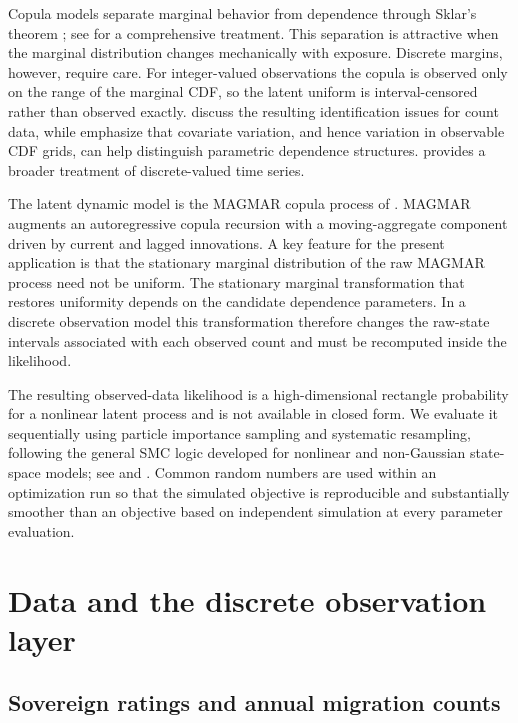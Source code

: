 \documentclass[11pt]{article}
\theoremstyle{definition}
\begin{document}
Copula models separate marginal behavior from dependence through Sklar's theorem
\citep{sklar1959}; see \citet{joe2014} for a comprehensive treatment. This
separation is attractive when the marginal distribution changes mechanically with
exposure. Discrete margins, however, require care. For integer-valued observations
the copula is observed only on the range of the marginal CDF, so the latent uniform
is interval-censored rather than observed exactly. \citet{genestneslehova2007}
discuss the resulting identification issues for count data, while
\citet{trivedizimmer2017} emphasize that covariate variation, and hence variation in
observable CDF grids, can help distinguish parametric dependence structures.
\citet{weiss2018intcount} provides a broader treatment of discrete-valued time
series.

The latent dynamic model is the MAGMAR copula process of
\citet{pappert2026mag}. MAGMAR augments an autoregressive copula recursion with a
moving-aggregate component driven by current and lagged innovations. A key feature
for the present application is that the stationary marginal distribution of the raw
MAGMAR process need not be uniform. The stationary marginal transformation that
restores uniformity depends on the candidate dependence parameters. In a discrete
observation model this transformation therefore changes the raw-state intervals
associated with each observed count and must be recomputed inside the likelihood.

The resulting observed-data likelihood is a high-dimensional rectangle probability
for a nonlinear latent process and is not available in closed form. We evaluate it
sequentially using particle importance sampling and systematic resampling, following
the general SMC logic developed for nonlinear and non-Gaussian state-space models;
see \citet{delmoral2004} and \citet{doucetjohansen2011}. Common random numbers are
used within an optimization run so that the simulated objective is reproducible and
substantially smoother than an objective based on independent simulation at every
parameter evaluation.

\section{Data and the discrete observation layer}
\label{sec:data}

\subsection{Sovereign ratings and annual migration counts}
\end{document}
